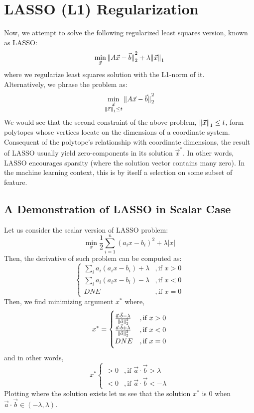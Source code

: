 \section{LASSO (L1) Regularization}
Now, we attempt to solve the following regularized least squares version, known as LASSO:
\[
    \min_{\vec{x}} \pnorm[2]{A \vec{x} - \vec{b}}{2} + \lambda \pnorm{\vec{x}}{1}
\]
where we regularize least squares solution with the L1-norm of it. \\
Alternatively, we phrase the problem as:
\[
    \min_{
        \substack{
            \vec{x} \\
            \pnorm{\vec{x}}{1} \leq t
        }
    } \pnorm[2]{A \vec{x} - \vec{b}}{2}
\]
We would see that the second constraint of the above problem, $\pnorm{\vec{x}}{1} \leq t$, form polytopes whose vertices locate on the dimensions of a coordinate system. \\
Consequent of the polytope's relationship with coordinate dimensions, the result of LASSO usually yield zero-components in its solution $\vec{x}^*$.
In other words, LASSO encourages sparsity (where the solution vector contains many zero).
In the machine learning context, this is by itself a selection on some subset of feature.

\subsection{A Demonstration of LASSO in Scalar Case}
Let us consider the scalar version of LASSO problem:
\[
    \min_x \frac{1}{2} \sum_{i = 1}^n {(a_i x - b_i)}^2 + \lambda |x|
\]
Then, the derivative of such problem can be computed as:
\[
    \begin{cases}
        \sum_i a_i(a_i x - b_i) + \lambda &, \text{if } x > 0 \\
        \sum_i a_i(a_i x - b_i) - \lambda &, \text{if } x < 0 \\
        DNE &, \text{if } x = 0
    \end{cases}
\]
Then, we find minimizing argument $x^*$ where,
\[
    x^* =
    \begin{cases}
        \frac{\vec{a} \cdot \vec{b} - \lambda}{\pnorm[2]{\vec{a}}{2}} &, \text{if } x > 0 \\
        \frac{\vec{a} \cdot \vec{b} + \lambda}{\pnorm[2]{\vec{a}}{2}} &, \text{if } x < 0 \\
        DNE &, \text{if } x = 0
    \end{cases}
\]
and in other words,
\[
    x^*
    \begin{cases}
        > 0 &, \text{if } \vec{a} \cdot \vec{b} > \lambda \\
        < 0 &, \text{if } \vec{a} \cdot \vec{b} < -\lambda
    \end{cases}
\]
Plotting where the solution exists let us see that the solution $x^*$ is $0$ when $\vec{a} \cdot \vec{b} \in (-\lambda, \lambda)$.
